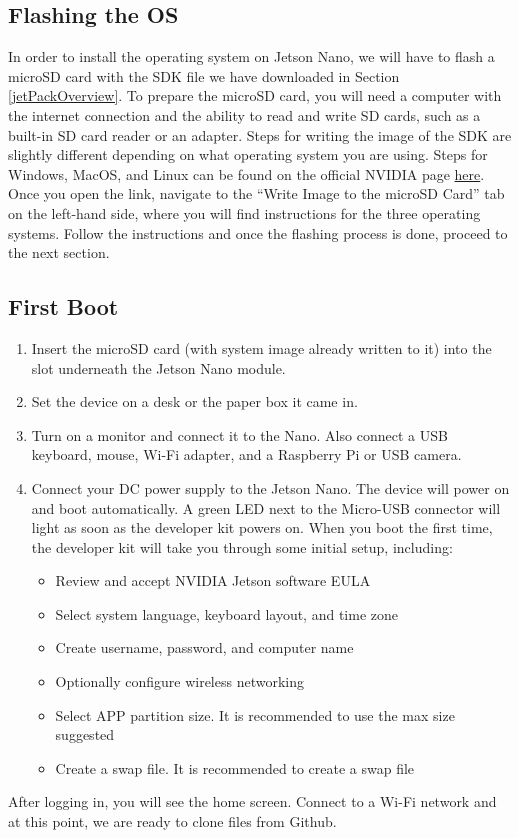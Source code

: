 \documentclass[letter, 12pt]{article}
\begin{document}
	\subsection{Flashing the OS}
	\noindent In order to install the operating system on Jetson Nano, we will have to flash a microSD card with the SDK file we have downloaded in Section \ref{jetPackOverview}. To prepare the microSD card, you will need a computer with the internet connection and the ability to read and write SD cards, such as a built-in SD card reader or an adapter. Steps for writing the image of the SDK are slightly different depending on what operating system you are using. Steps for Windows, MacOS, and Linux can be found on the official NVIDIA page \href{https://developer.nvidia.com/embedded/learn/get-started-jetson-nano-2gb-devkit#prepare}{here}. Once you open the link, navigate to the ``Write Image to the microSD Card'' tab on the left-hand side, where you will find instructions for the three operating systems. Follow the instructions and once the flashing process is done, proceed to the next section.
	
	\subsection{First Boot}
	\noindent \begin{enumerate}
		\item Insert the microSD card (with system image already written to it) into the slot underneath the Jetson Nano module.
		\item Set the device on a desk or the paper box it came in. 
		\item Turn on a monitor and connect it to the Nano. Also connect a USB keyboard, mouse, Wi-Fi adapter, and a Raspberry Pi or USB camera.
		\item Connect your DC power supply to the Jetson Nano. The device will power on and boot automatically. A green LED next to the Micro-USB connector will light as soon as the developer kit powers on. When you boot the first time, the developer kit will take you through some initial setup, including:
		\begin{itemize}
			\item Review and accept NVIDIA Jetson software EULA
			\item Select system language, keyboard layout, and time zone
			\item Create username, password, and computer name
			\item Optionally configure wireless networking
			\item Select APP partition size. It is recommended to use the max size suggested
			\item Create a swap file. It is recommended to create a swap file
		\end{itemize}
	\end{enumerate}
	\noindent After logging in, you will see the home screen. Connect to a Wi-Fi network and at this point, we are ready to clone files from Github.
	
\end{document}
